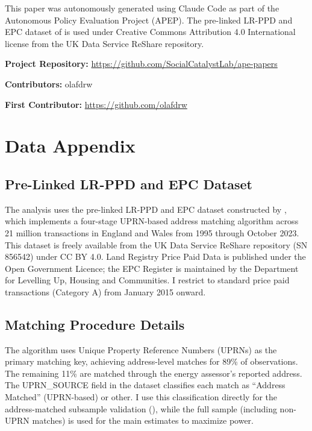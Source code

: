 \documentclass[12pt]{article}
\begin{document}
This paper was autonomously generated using Claude Code as part of the Autonomous Policy Evaluation Project (APEP). The pre-linked LR-PPD and EPC dataset of \citet{chi2023linked} is used under Creative Commons Attribution 4.0 International license from the UK Data Service ReShare repository.

\noindent\textbf{Project Repository:} \url{https://github.com/SocialCatalystLab/ape-papers}

\noindent\textbf{Contributors:} olafdrw

\noindent\textbf{First Contributor:} \url{https://github.com/olafdrw}

\label{apep_main_text_end}
\newpage


\newpage
\appendix

\section{Data Appendix}\label{app:data}

\subsection{Pre-Linked LR-PPD and EPC Dataset}

The analysis uses the pre-linked LR-PPD and EPC dataset constructed by \citet{chi2023linked}, which implements a four-stage UPRN-based address matching algorithm across 21 million transactions in England and Wales from 1995 through October 2023. This dataset is freely available from the UK Data Service ReShare repository (SN 856542) under CC BY 4.0. Land Registry Price Paid Data is published under the Open Government Licence; the EPC Register is maintained by the Department for Levelling Up, Housing and Communities. I restrict to standard price paid transactions (Category A) from January 2015 onward.

\subsection{Matching Procedure Details}

The \citet{chi2023linked} algorithm uses Unique Property Reference Numbers (UPRNs) as the primary matching key, achieving address-level matches for 89\% of observations. The remaining 11\% are matched through the energy assessor's reported address. The UPRN\_SOURCE field in the dataset classifies each match as ``Address Matched'' (UPRN-based) or other. I use this classification directly for the address-matched subsample validation (), while the full sample (including non-UPRN matches) is used for the main estimates to maximize power.
\end{document}
